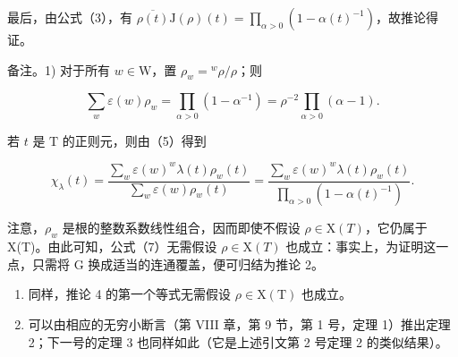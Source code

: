最后，由公式（3），有 \(\overline{\rho(t)}\mathrm{J}(\rho)(t) = \prod_{\alpha >0}(1 - \alpha (t)^{-1})\)，故推论得证。

备注。1) 对于所有 \(w \in \mathrm{W}\)，置 \(\rho_w = {}^w\rho /\rho\)；则

\[
\sum_ {w} \varepsilon (w) \rho_ {w} = \prod_ {\alpha > 0} (1 - \alpha^ {- 1}) = \rho^ {- 2} \prod_ {\alpha > 0} (\alpha - 1).\tag{6}
\]

若 \(t\) 是 \(\mathrm{T}\) 的正则元，则由（5）得到

\[
\chi_ {\lambda} (t) = \frac {\sum_ {w} \varepsilon (w) ^ {w} \lambda (t) \rho_ {w} (t)}{\sum_ {w} \varepsilon (w) \rho_ {w} (t)} = \frac {\sum_ {w} \varepsilon (w) ^ {w} \lambda (t) \rho_ {w} (t)}{\prod_ {\alpha > 0} (1 - \alpha (t) ^ {- 1})}.\tag{7}
\]

注意，\(\rho_{w}\) 是根的整数系数线性组合，因而即使不假设 \(\rho \in \mathrm{X}(T)\)，它仍属于 X(T)。由此可知，公式（7）无需假设 \(\rho \in \mathrm{X}(T)\) 也成立：事实上，为证明这一点，只需将 G 换成适当的连通覆盖，便可归结为推论 2。

\begin{enumerate}
\def\labelenumi{\arabic{enumi})}
\setcounter{enumi}{1}
\item
  同样，推论 4 的第一个等式无需假设 \(\rho \in \mathrm{X}(\mathrm{T})\) 也成立。
\item
  可以由相应的无穷小断言（第 VIII 章，第 9 节，第 1 号，定理 1）推出定理 2；下一号的定理 3 也同样如此（它是上述引文第 2 号定理 2 的类似结果）。
\end{enumerate}

